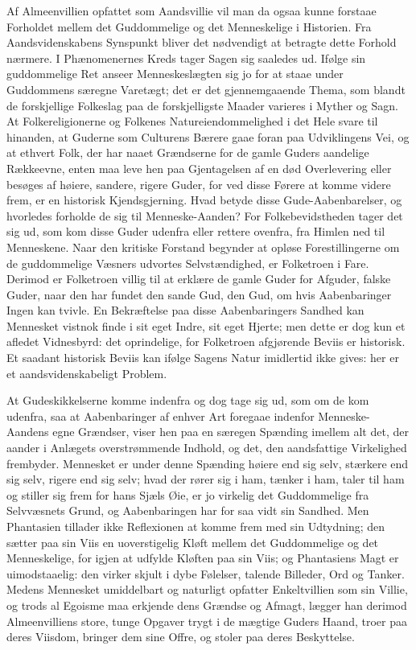\documentclass[12pt]{book}
\newcommand{\apage}[1]{\marginnote{\footnotesize\textit{[#1]}}}
\begin{document}
Af Almeenvillien opfattet som Aandsvillie vil man da ogsaa kunne forstaae
Forholdet mellem det Guddommelige og det Menneskelige i Historien. Fra
Aandsvidenskabens Synspunkt bliver det nødvendigt at betragte dette Forhold
nærmere. I Phænomenernes Kreds tager Sagen sig saaledes ud. Ifølge sin
guddommelige Ret anseer Menneskeslægten sig jo for at staae under
Guddommens særegne Varetægt; det er det gjennemgaaende Thema, som blandt de
forskjellige Folkeslag paa de forskjelligste Maader varieres i Myther og
Sagn. At Folkereligionerne og Folkenes Natureiendommelighed i det Hele svare
til hinanden, at Guderne som Culturens Bærere gaae foran paa Udviklingens
Vei, og at ethvert Folk, der har naaet Grændserne for de gamle Guders
aandelige Rækkeevne, enten maa leve hen paa Gjentagelsen af en død
Overlevering eller besøges af høiere, sandere, rigere Guder, for ved disse
Førere at komme videre frem, er en historisk Kjendsgjerning. Hvad betyde
disse Gude-Aabenbarelser, og hvorledes forholde de sig til Menneske-Aanden?
For Folkebevidstheden tager det sig ud, som kom disse Guder udenfra eller
rettere ovenfra, fra Himlen ned til Menneskene. Naar den kritiske Forstand
begynder at opløse Forestillingerne om de guddommelige Væsners udvortes
Selvstændighed, er Folketroen i Fare.  \apage{239} Derimod er Folketroen villig til at
erklære de gamle Guder for Afguder, falske Guder, naar den har fundet den
sande Gud, den Gud, om hvis Aabenbaringer Ingen kan tvivle. En Bekræftelse
paa disse Aabenbaringers Sandhed kan Mennesket vistnok finde i sit eget
Indre, sit eget Hjerte; men dette er dog kun et afledet Vidnesbyrd: det
oprindelige, for Folketroen afgjørende Beviis er historisk. Et saadant
historisk Beviis kan ifølge Sagens Natur imidlertid ikke gives: her er et
aandsvidenskabeligt Problem.

At Gudeskikkelserne komme indenfra og dog tage sig ud, som om de kom
udenfra, saa at Aabenbaringer af enhver Art foregaae indenfor
Menneske-Aandens egne Grændser, viser hen paa en særegen Spænding imellem
alt det, der aander i Anlægets overstrømmende Indhold, og det, den
aandsfattige Virkelighed frembyder. Mennesket er under denne Spænding høiere
end sig selv, stærkere end sig selv, rigere end sig selv; hvad der rører sig
i ham, tænker i ham, taler til ham og stiller sig frem for hans Sjæls Øie,
er jo virkelig det Guddommelige fra Selvvæsnets Grund, og Aabenbaringen har
for saa vidt sin Sandhed. Men Phantasien tillader ikke Reflexionen at komme
frem med sin Udtydning; den sætter paa sin Viis en uoverstigelig Kløft
mellem det Guddommelige og det Menneskelige, for igjen at udfylde Kløften
paa sin Viis; og Phantasiens Magt er uimodstaaelig: den virker skjult i dybe
Følelser, talende Billeder, Ord og Tanker. Medens Mennesket umiddelbart og
naturligt opfatter Enkeltvillien som sin Villie, og trods al Egoisme maa \apage{240} 
erkjende dens Grændse og Afmagt, lægger han derimod Almeenvilliens store,
tunge Opgaver trygt i de mægtige Guders Haand, troer paa deres Viisdom,
bringer dem sine Offre, og stoler paa deres Beskyttelse.
\end{document}
